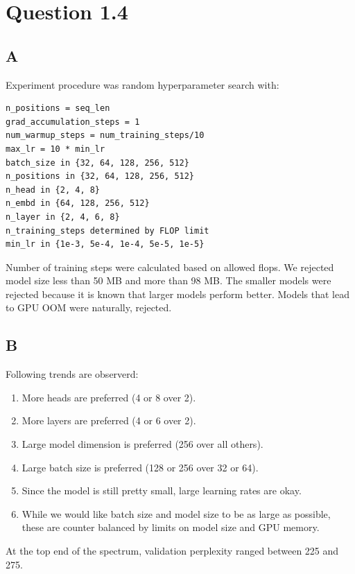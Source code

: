 \documentclass{article}
\begin{document}
\section*{Question 1.4}
\subsection*{A}
Experiment procedure was random hyperparameter search with:
\begin{verbatim}
n_positions = seq_len
grad_accumulation_steps = 1
num_warmup_steps = num_training_steps/10
max_lr = 10 * min_lr
batch_size in {32, 64, 128, 256, 512}
n_positions in {32, 64, 128, 256, 512}
n_head in {2, 4, 8}
n_embd in {64, 128, 256, 512}
n_layer in {2, 4, 6, 8}
n_training_steps determined by FLOP limit
min_lr in {1e-3, 5e-4, 1e-4, 5e-5, 1e-5}
\end{verbatim}
 Number of training steps were calculated based on allowed flops. We rejected model size less than 50 MB and more than 98 MB. The smaller models were rejected because it is known that larger models perform better. Models that lead to GPU OOM were naturally, rejected.
\subsection*{B}
Following trends are observerd:
\begin{enumerate}
\item More heads are preferred (4 or 8 over 2).
\item More layers are preferred (4 or 6 over 2).
\item Large model dimension is preferred (256 over all others).
\item Large batch size is preferred (128 or 256 over 32 or 64).
\item Since the model is still pretty small, large learning rates are okay.
\item While we would like batch size and model size to be as large as possible, these are counter balanced by limits on model size and GPU memory.
\end{enumerate}
At the top end of the spectrum, validation perplexity ranged between 225 and 275.
\end{document}
